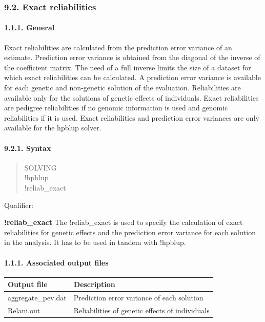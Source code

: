 \subsubsection{9.2. Exact reliabilities}\label{Reli03}

\paragraph{1.1.1. General}\label{Reli04}

Exact reliabilities are calculated from the prediction error variance of
an estimate. Prediction error variance is obtained from the diagonal of
the inverse of the coefficient matrix. The need of a full inverse limits
the size of a dataset for which exact reliabilities can be calculated. A
prediction error variance is available for each genetic and non-genetic
solution of the evaluation. Reliabilities are available only for the
solutions of genetic effects of individuals. Exact reliabilities are
pedigree reliabilities if no genomic information is used and genomic
reliabilities if it is used. Exact reliabilities and prediction error
variances are only available for the hpblup solver.

\paragraph{9.2.1. Syntax}\label{Reli05}

\begin{quote}
SOLVING\\
!hpblup\\
!reliab\_exact
\end{quote}

Qualifier:

\textbf{!reliab\_exact} The !reliab\_exact is used to specify the
calculation of exact reliabilities for genetic effects and the
prediction error variance for each solution in the analysis. It has to
be used in tandem with !hpblup.

\paragraph{1.1.1. Associated output files}\label{Reli06}

{\def\LTcaptype{none} %
\begin{longtable}[]{@{}ll@{}}
\toprule\noalign{}
Output file & Description \\
\midrule\noalign{}
\endhead
\bottomrule\noalign{}
\endlastfoot
aggregate\_pev.dat & Prediction error variance of each solution \\
Relani.out & Reliabilities of genetic effects of individuals \\
\end{longtable}
}

